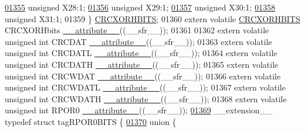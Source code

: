 \begin{DoxyCode}
\hypertarget{a00015_source_l01355}{}\hyperlink{a00014_a7870476992e5e2067067fc0be6954b53}{01355}   \textcolor{keywordtype}{unsigned} X28:1;
\hypertarget{a00015_source_l01356}{}\hyperlink{a00014_ab083e9ac9e3d68ece2a7648da71037ff}{01356}   \textcolor{keywordtype}{unsigned} X29:1;
\hypertarget{a00015_source_l01357}{}\hyperlink{a00014_a74cf3409511eae45282fd11004523974}{01357}   \textcolor{keywordtype}{unsigned} X30:1;
\hypertarget{a00015_source_l01358}{}\hyperlink{a00014_ab1dedfa9b394f7fa0afee647b393effe}{01358}   \textcolor{keywordtype}{unsigned} X31:1;
01359 \} \hyperlink{a00014_d9/d9b/a00363}{CRCXORHBITS};
01360 \textcolor{keyword}{extern} \textcolor{keyword}{volatile} \hyperlink{a00014_d9/d9b/a00363}{CRCXORHBITS} CRCXORHbits \hyperlink{a00015_a493c46f03454991ccc5aa7a6e1dfb2a7}{\_\_attribute\_\_}((\_\_sfr\_\_));
01361 
01362 \textcolor{keyword}{extern} \textcolor{keyword}{volatile} \textcolor{keywordtype}{unsigned} \textcolor{keywordtype}{int}  CRCDAT \hyperlink{a00015_a493c46f03454991ccc5aa7a6e1dfb2a7}{\_\_attribute\_\_}((\_\_sfr\_\_));
01363 \textcolor{keyword}{extern} \textcolor{keyword}{volatile} \textcolor{keywordtype}{unsigned} \textcolor{keywordtype}{int}  CRCDATL \hyperlink{a00015_a493c46f03454991ccc5aa7a6e1dfb2a7}{\_\_attribute\_\_}((\_\_sfr\_\_));
01364 \textcolor{keyword}{extern} \textcolor{keyword}{volatile} \textcolor{keywordtype}{unsigned} \textcolor{keywordtype}{int}  CRCDATH \hyperlink{a00015_a493c46f03454991ccc5aa7a6e1dfb2a7}{\_\_attribute\_\_}((\_\_sfr\_\_));
01365 \textcolor{keyword}{extern} \textcolor{keyword}{volatile} \textcolor{keywordtype}{unsigned} \textcolor{keywordtype}{int}  CRCWDAT \hyperlink{a00015_a493c46f03454991ccc5aa7a6e1dfb2a7}{\_\_attribute\_\_}((\_\_sfr\_\_));
01366 \textcolor{keyword}{extern} \textcolor{keyword}{volatile} \textcolor{keywordtype}{unsigned} \textcolor{keywordtype}{int}  CRCWDATL \hyperlink{a00015_a493c46f03454991ccc5aa7a6e1dfb2a7}{\_\_attribute\_\_}((\_\_sfr\_\_));
01367 \textcolor{keyword}{extern} \textcolor{keyword}{volatile} \textcolor{keywordtype}{unsigned} \textcolor{keywordtype}{int}  CRCWDATH \hyperlink{a00015_a493c46f03454991ccc5aa7a6e1dfb2a7}{\_\_attribute\_\_}((\_\_sfr\_\_));
01368 \textcolor{keyword}{extern} \textcolor{keyword}{volatile} \textcolor{keywordtype}{unsigned} \textcolor{keywordtype}{int}  RPOR0 \hyperlink{a00015_a493c46f03454991ccc5aa7a6e1dfb2a7}{\_\_attribute\_\_}((\_\_sfr\_\_));
\hypertarget{a00015_source_l01369}{}\hyperlink{a00014}{01369} \_\_extension\_\_ \textcolor{keyword}{typedef} \textcolor{keyword}{struct }tagRPOR0BITS \{
\hypertarget{a00015_source_l01370}{}\hyperlink{a00015}{01370}   \textcolor{keyword}{union }\{

\end{DoxyCode}
